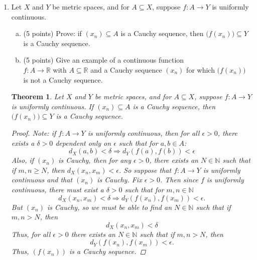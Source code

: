 \documentclass{amsart}
\newtheorem{theorem}{Theorem}
\begin{document}
\begin{enumerate}[1.]
    \newpage
    \item Let $X$ and $Y$ be metric spaces, and for $A \subseteq X$, suppose $f: A \to Y$ is uniformly continuous.
    \begin{enumerate}[(a)]
    \item (5 points) Prove: if $(x_n) \subseteq A$ is a Cauchy sequence, then $\big( f(x_n) \big) \subseteq Y$ is a Cauchy sequence.
    \item (5 points) Give an example of a continuous function \\ $f: A \to \mathbb{R}$ with $A \subseteq \mathbb{R}$ and a Cauchy sequence $(x_n)$ for which $\big( f(x_n) \big)$ is not a Cauchy sequence.
        \end{enumerate}
    \begin{theorem}
        Let $X$ and $Y$ be metric spaces, and for $A \subseteq X$, suppose $f: A \to Y$ is uniformly continuous. If $(x_n) \subseteq A$ is a Cauchy sequence, then $\big( f(x_n) \big) \subseteq Y$ is a Cauchy sequence.
        \begin{proof}
            Note: if $f: A \to Y$ is uniformly continuous, then for all $\epsilon > 0$, there exists a $\delta > 0$ dependent only on $\epsilon$ such that for $a, b\in A$:
            \[
                d_X(a,b) < \delta \Rightarrow d_Y(f(a), f(b)) < \epsilon    
            \]
            Also, if $(x_n)$ is Cauchy, then for any $\epsilon > 0$, there exists an $N \in \mathbb{N}$ such that if $m,n \geq N$, then
            $d_X(x_n, x_m) < \epsilon$.
            So suppose that $f: A \to Y$ is uniformly continuous and that $(x_n)$ is Cauchy. Fix $\epsilon > 0$. Then since $f$ is uniformly continuous, there must exist a $\delta > 0$ such that for $m, n \in \mathbb{N}$
            \[
                d_X(x_n, x_m) < \delta \Rightarrow d_Y(f(x_n), f(x_m)) < \epsilon.
            \]
            But $(x_n)$ is Cauchy, so we must be able to find an $N \in \mathbb{N}$ such that if $m,n > N$, then
            \[
                d_X(x_n, x_m) < \delta    
            \]
            Thus, for all $\epsilon > 0$ there exists an $N \in \mathbb{N}$ such that if $m,n > N$, then 
            \[
                d_Y(f(x_n), f(x_m)) < \epsilon.    
            \]
            Thus, $(f(x_n))$ is a Cauchy sequence.
        \end{proof}
    \end{theorem}
       

\end{enumerate}
\end{document}
